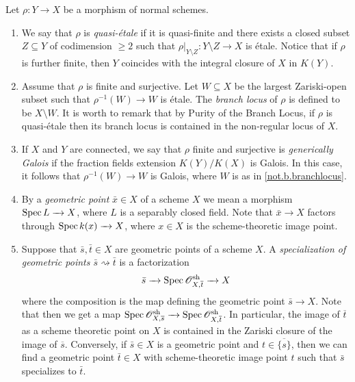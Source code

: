 \documentclass[12pt]{amsart}
\numberwithin{equation}{theorem}
\renewcommand{\:}{\colon}
\theoremstyle{theorem}
\renewcommand{\O}{\mathscr O}
\begin{document}


\begin{notation}
Let $\rho\colon Y \to X$ be a morphism of normal schemes.
\begin{enumerate}
\item
We say that $\rho$ is \emph{quasi-\'etale} if it is quasi-finite and there exists a closed subset $Z \subseteq Y$ of codimension $\ge 2$ such that $\rho|_{Y \setminus Z}\colon Y \setminus Z \to X$ is \'etale.
Notice that if $\rho$ is further finite, then $Y$ coincides with the integral closure of $X$ in $K(Y)$.
\item
\label{not.b.branchlocus}
Assume that $\rho$ is finite and surjective. Let $W \subseteq X$ be the largest Zariski-open subset such that $\rho^{-1}(W) \to W$ is \'etale.
The \emph{branch locus} of $\rho$ is defined to be $X \setminus W$.
It is worth to remark that by Purity of the Branch Locus, if $\rho$ is quasi-\'etale then its branch locus is contained in the non-regular locus of $X$.
\item
If $X$ and $Y$ are connected, we say that $\rho$ finite and surjective is \emph{generically Galois} if the fraction fields extension $K(Y)/K(X)$ is Galois.
In this case, it follows that $\rho^{-1}(W) \to W$ is Galois, where $W$ is as in \autoref{not.b.branchlocus}.
\item
By a \emph{geometric point} $\bar x \in X$ of a scheme $X$ we mean a morphism $\operatorname{{Spec}} L \xrightarrow{\ \ } X$, where $L$ is a separably closed field.
Note that $\bar x \to X$ factors through $\operatorname{{Spec}} k(x) \xrightarrow{\ \ } X$, where $x \in X$ is the scheme-theoretic image point.
\item
Suppose that $\bar s, \bar t \in X$ are geometric points of a scheme $X$.
A \emph{specialization of geometric points $\bar s \rightsquigarrow \bar t$} is a factorization
\[
\bar s \to \Spec \O_{X, \overline{t}}^{\sh} \to X
\]
where the composition is the map defining the geometric point $\bar s \to X$.
Note that then we get a map $\Spec \O_{X,\overline{s}}^{\sh} \to \Spec \O_{X,\overline{t}}^{\sh}$.
In particular, the image of $\overline{t}$ as a scheme theoretic point on $X$ is contained in the Zariski closure of the image of $\overline{s}$.
Conversely, if $\bar s \in X$ is a geometric point and $t \in \overline{ \{ s \} }$, then we can find a geometric point $\bar t \in X$ with scheme-theoretic image point $t$ such that $\bar s$ specializes to $\bar t$.
\end{enumerate}
\end{notation}
\end{document}
